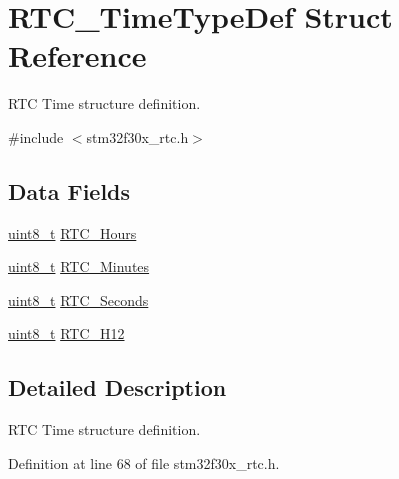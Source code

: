\hypertarget{struct_r_t_c___time_type_def}{\section{R\-T\-C\-\_\-\-Time\-Type\-Def Struct Reference}
\label{struct_r_t_c___time_type_def}
}


R\-T\-C Time structure definition.  




{\ttfamily \#include $<$stm32f30x\-\_\-rtc.\-h$>$}

\subsection*{Data Fields}
\begin{DoxyCompactItemize}
\item 
\hyperlink{stdint_8h_aba7bc1797add20fe3efdf37ced1182c5}{uint8\-\_\-t} \hyperlink{struct_r_t_c___time_type_def_a9ff1221096e27f89f3b4f645ca374221}{R\-T\-C\-\_\-\-Hours}
\item 
\hyperlink{stdint_8h_aba7bc1797add20fe3efdf37ced1182c5}{uint8\-\_\-t} \hyperlink{struct_r_t_c___time_type_def_ad61e54d493464c02992ba18045c48cad}{R\-T\-C\-\_\-\-Minutes}
\item 
\hyperlink{stdint_8h_aba7bc1797add20fe3efdf37ced1182c5}{uint8\-\_\-t} \hyperlink{struct_r_t_c___time_type_def_a7c2a8d308f1cc38a08d557f6560b52c7}{R\-T\-C\-\_\-\-Seconds}
\item 
\hyperlink{stdint_8h_aba7bc1797add20fe3efdf37ced1182c5}{uint8\-\_\-t} \hyperlink{struct_r_t_c___time_type_def_ae55dcfa804d1c40f8981b5b314f65065}{R\-T\-C\-\_\-\-H12}
\end{DoxyCompactItemize}


\subsection{Detailed Description}
R\-T\-C Time structure definition. 

Definition at line 68 of file stm32f30x\-\_\-rtc.\-h.



